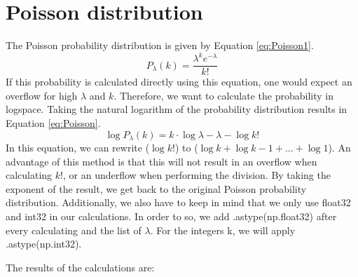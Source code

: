 \section{Poisson distribution}

The Poisson probability distribution is given by Equation \ref{eq:Poisson1}. 
\begin{equation}\label{eq:Poisson1}
    P_{\lambda}(k) = \frac{\lambda^k e^{-\lambda}}{k!}
\end{equation}
If this probability is calculated directly using this equation, one would expect an overflow for high $\lambda$ and $k$. Therefore, we want to calculate the probability in logspace. Taking the natural logarithm of the probability distribution results in Equation \ref{eq:Poisson}. 
\begin{equation}\label{eq:Poisson}
    \log{P_{\lambda}(k)} = k \cdot \log{\lambda} - \lambda - \log{k!}
\end{equation}
In this equation, we can rewrite ($\log{k!}$) to ($\log{k} + \log{k-1} + ... + \log{1}$). An advantage of this method is that this will not result in an overflow when calculating $k!$, or an underflow when performing the division. By taking the exponent of the result, we get back to the original Poisson probability distribution. Additionally, we also have to keep in mind that we only use float32 and int32 in our calculations. In order to so, we add .astype(np.float32) after every calculating and the list of $\lambda$. For the integers k, we will apply .astype(np.int32). 

The results of the calculations are: 



